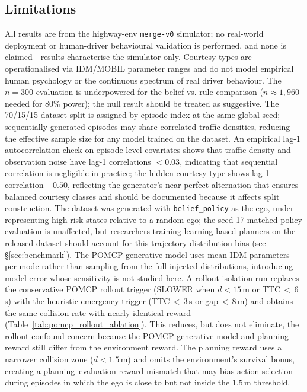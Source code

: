 \subsection{Limitations}
All results are from the highway-env \texttt{merge-v0} simulator; no
real-world deployment or human-driver behavioural validation is performed, and
none is claimed---results characterise the simulator only.
Courtesy types are operationalised via IDM/MOBIL parameter ranges and do
not model empirical human psychology or the continuous spectrum of real
driver behaviour.
The $n{=}300$ evaluation is underpowered for the belief-vs.-rule
comparison ($n{\approx}1{,}960$ needed for 80\% power); the null result
should be treated as suggestive.
The 70/15/15 dataset split is assigned by episode index at the same global
seed; sequentially generated episodes may share correlated traffic densities,
reducing the effective sample size for any model trained on the dataset.
An empirical lag-1 autocorrelation check on episode-level covariates shows
that traffic density and observation noise have lag-1 correlations $<0.03$,
indicating that sequential correlation is negligible in practice; the hidden
courtesy type shows lag-1 correlation $-0.50$, reflecting the generator's
near-perfect alternation that ensures balanced courtesy classes and should be
documented because it affects split construction.
The dataset was generated with \texttt{belief\_policy} as the ego,
under-representing high-risk states relative to a random ego; the seed-17
matched policy evaluation is unaffected, but researchers training
learning-based planners on the released dataset should account for this
trajectory-distribution bias (see \S\ref{sec:benchmark}).
The POMCP generative model uses mean IDM parameters per mode rather than
sampling from the full injected distributions, introducing model error
whose sensitivity is not studied here.
A rollout-isolation run replaces the conservative POMCP rollout trigger
(SLOWER when $d{<}15$\,m or TTC\,$<$\,6\,s) with the heuristic emergency
trigger (TTC\,$<$\,3\,s or gap\,$<$\,8\,m) and obtains the same collision
rate with nearly identical reward (Table~\ref{tab:pomcp_rollout_ablation}).
This reduces, but does not eliminate, the rollout-confound concern because
the POMCP generative model and planning reward still differ from the
environment reward.
The planning reward uses a narrower collision zone ($d{<}1.5$\,m) and
omits the environment's survival bonus, creating a planning--evaluation
reward mismatch that may bias action selection during episodes in which the
ego is close to but not inside the $1.5$\,m threshold.
